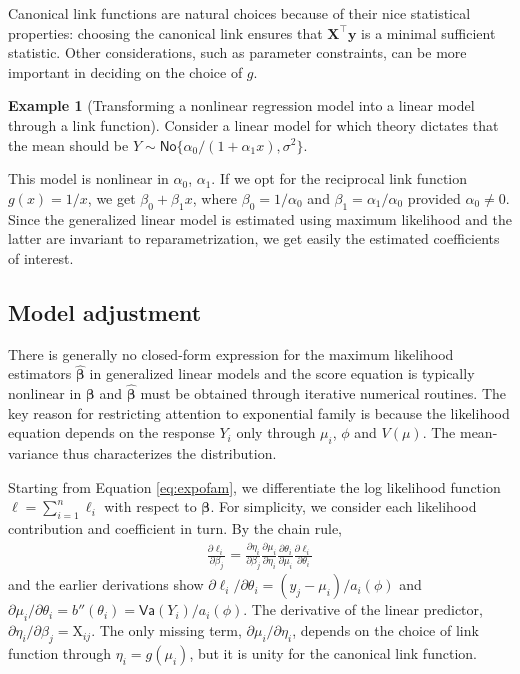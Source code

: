 \documentclass[
  11pt,
  letterpaper,
]{book}
\theoremstyle{definition}
\theoremstyle{definition}
\newtheorem{example}{Example}[chapter]
\theoremstyle{definition}
\theoremstyle{remark}
\begin{document}
Canonical link functions are natural choices because of their nice statistical properties: choosing the canonical link ensures that \(\mathbf{X}^\top\boldsymbol{y}\) is a minimal sufficient statistic. Other considerations, such as parameter constraints, can be more important in deciding on the choice of \(g\).

\begin{example}[Transforming a nonlinear regression model into a linear model through a link function]
\protect\hypertarget{exm:inverslinklm}{}{\label{exm:inverslinklm} {} }
Consider a linear model for which theory dictates that the mean should be \(Y \sim \mathsf{No}\{\alpha_0/(1+\alpha_1x), \sigma^2\}\).

This model is nonlinear in \(\alpha_0\), \(\alpha_1\). If we opt for the reciprocal link function \(g(x)=1/x\), we get \(\beta_0+\beta_1 x\), where \(\beta_0 = 1/\alpha_0\) and \(\beta_1 = \alpha_1/\alpha_0\) provided \(\alpha_0 \neq 0\). Since the generalized linear model is estimated using maximum likelihood and the latter are invariant to reparametrization, we get easily the estimated coefficients of interest.
\end{example}

\hypertarget{model-adjustment}{%
\subsection{Model adjustment}\label{model-adjustment}}

There is generally no closed-form expression for the maximum likelihood estimators \(\widehat{\boldsymbol{\beta}}\) in generalized linear models and the score equation is typically nonlinear in \(\boldsymbol{\beta}\) and \(\widehat{\boldsymbol{\beta}}\) must be obtained through iterative numerical routines. The key reason for restricting attention to exponential family is because the likelihood equation depends on the response \(Y_i\) only through \(\mu_i\), \(\phi\) and \(V(\mu)\). The mean-variance thus characterizes the distribution.

Starting from Equation \eqref{eq:expofam}, we differentiate the log likelihood function \(\ell = \sum_{i=1}^n \ell_i\) with respect to \(\boldsymbol{\beta}\). For simplicity, we consider each likelihood contribution and coefficient in turn. By the chain rule,
\begin{align*}
\frac{\partial \ell_i}{\partial \beta_j} = \frac{\partial \eta_i}{\partial \beta_j} \frac{\partial \mu_i}{\partial \eta_i} \frac{\partial \theta_i}{\partial \mu_i}\frac{\partial \ell_i}{\partial \theta_i}
\end{align*}
and the earlier derivations show \(\partial \ell_i/\partial \theta_i = (y_j-\mu_i)/a_i(\phi)\) and \(\partial \mu_i / \partial \theta_i = b''(\theta_i) = \mathsf{Va}(Y_i)/a_i(\phi)\). The derivative of the linear predictor, \(\partial \eta_i / \partial \beta_j = \mathrm{X}_{ij}\). The only missing term, \(\partial \mu_i/\partial \eta_i\), depends on the choice of link function through \(\eta_i = g(\mu_i)\), but it is unity for the canonical link function.
\end{document}
